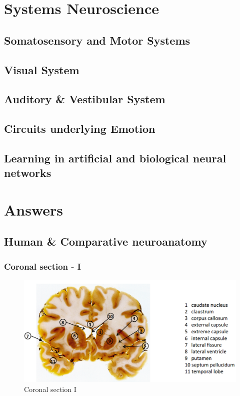 \documentclass[12pt,article,oneside,a4paper]{memoir}
\begin{document}
\section{Systems Neuroscience}
\subsection{Somatosensory and Motor Systems}
\subsection{Visual System}
\subsection{Auditory \& Vestibular System}
\subsection{Circuits underlying Emotion}
\subsection{Learning in artificial and biological neural networks}

\section{Answers}
\subsection{Human \& Comparative neuroanatomy}

\subsubsection{Coronal section - I}
\begin{figure}[H]
	\centering
  	\includegraphics[width=\linewidth]{imgs/coronal-section-I-answer.png}
	\caption{Coronal section I}
  	\label{fig:coronalSectionI}
\end{figure}
\end{document}

